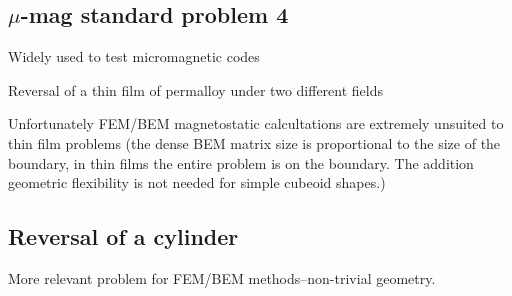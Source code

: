 \subsection{$\mu$-mag standard problem 4}

Widely used to test micromagnetic codes

Reversal of a thin film of permalloy under two different fields

Unfortunately FEM/BEM magnetostatic calcultations are extremely unsuited to thin film problems (the dense BEM matrix size is proportional to the size of the boundary, in thin films the entire problem is on the boundary. The addition geometric flexibility is not needed for simple cubeoid shapes.)


\subsection{Reversal of a cylinder}

More relevant problem for FEM/BEM methods--non-trivial geometry.






